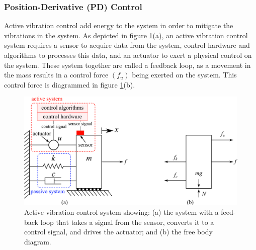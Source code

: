 \documentclass[12pt,letter]{article}
\numberwithin{ex}{section} %
\numberwithin{re}{section} %
\numberwithin{vcs}{section} %
\begin{document}
\subsubsection{Position-Derivative (PD) Control}

Active vibration control add energy to the system in order to mitigate the vibrations in the system. As depicted in figure \ref{fig:active_vibration_control_FBD}(a), an active vibration control system requires a sensor to acquire data from the system, control hardware and algorithms to processes this data, and an actuator to exert a physical control on the system. These system together are called a feedback loop, as a movement in the mass results in a control force $(f_u)$ being exerted on the system. This control force is diagrammed in figure \ref{fig:active_vibration_control_FBD}(b). 

\begin{figure}[H]
    \centering
    \includegraphics[width=5in]{../figures/active_vibration_control_FBD.png}
    \caption{Active vibration control system showing: (a) the system with a feed-back loop that takes a signal from the sensor, converts it to a control signal, and drives the actuator; and (b) the free body diagram.}
    \label{fig:active_vibration_control_FBD}
\end{figure}
\end{document}
